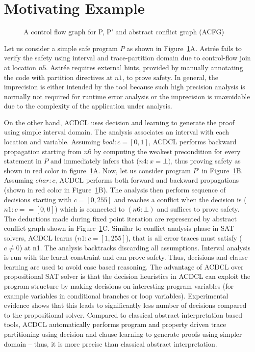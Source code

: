 \section{Motivating Example}
%
\begin{figure}[htp]
\centering
\vspace*{0.3cm}
\caption{A control flow graph for P, P' and abstract conflict graph (ACFG) \label{fig:filter}}
\end{figure}

Let us consider a simple safe program $P$ as shown in Figure~\ref{fig:filter}A.
Astr{\'e}e fails to verify the safety using interval and trace-partition domain
due to control-flow join at location $n5$.  Astr{\'e}e requires external hints, provided by 
manually annotating the code with partition directives at $n1$, to prove safety.  
In general, the imprecision is either intended by the tool because such high precision analysis is 
normally not required for runtime error analysis or the imprecision is unavoidable 
due to the complexity of the application under analysis.

On the other hand, ACDCL uses decision and learning to generate the proof 
using simple interval domain. The analysis associates an interval with each location and variable.  
Assuming $bool: c = [0,1]$, ACDCL performs backward propagation 
starting from $n6$ by computing the weakest precondition for every statement 
in $P$ and immediately infers that (\(n4: x = \bot)\), thus proving safety as shown in 
red color in figure~\ref{fig:filter}A.  Now, let us consider program $P'$ in
Figure~\ref{fig:filter}B. Assuming $char: c$, ACDCL performs both forward and
backward propagations (shown in red color in Figure~\ref{fig:filter}B).  
The analysis then perform sequence of decisions starting with $c = [0,255]$ and reaches a 
conflict when the decision is (\(n1:c == [0,0]\)) which is connected to $(n6: \bot)$ 
and suffices to prove safety.  The deductions made during fixed point
iteration are represented by abstract conflict graph shown in Figure~\ref{fig:filter}C. 
Similar to conflict analysis phase in SAT solvers, ACDCL learns (\(n1: c = [1,255]\)), 
that is all error traces must satisfy (\(c \neq 0\)) at n1.  The analysis backtracks 
discarding all assumptions. Interval analysis is run with the learnt constraint and 
can prove safety.  Thus, decisions and clause learning are used to avoid case based reasoning. 
The advantage of ACDCL over propositional SAT solver is that the decision heuristics in 
ACDCL can exploit the program structure by making decisions on interesting program 
variables (for example variables in conditional branches or loop variables). Experimental 
evidence shows that this leads to significantly less number of decisions compared 
to the propositional solver. Compared to classical abstract interpretation 
based tools, ACDCL automatically performs program and property driven trace partitioning 
using decision and clause learning to generate proofs using simpler domain -- thus, it is more 
precise than classical abstract interpretation.   
